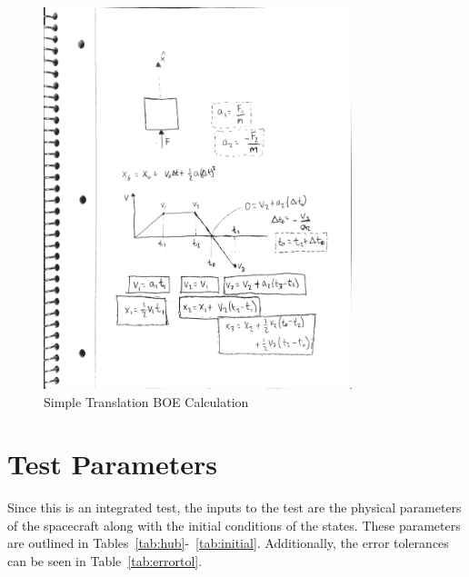 \begin{figure}[htbp]
	\centerline{
		\includegraphics[width=0.8\textwidth]{Figures/TranslationBOE}}
	\caption{Simple Translation BOE Calculation}
	\label{fig:BOETrans}
\end{figure}

\clearpage

\section{Test Parameters}

Since this is an integrated test, the inputs to the test are the physical parameters of the spacecraft along with the initial conditions of the states. These parameters are outlined in Tables~\ref{tab:hub}-~\ref{tab:initial}. Additionally, the error tolerances can be seen in Table~\ref{tab:errortol}.

